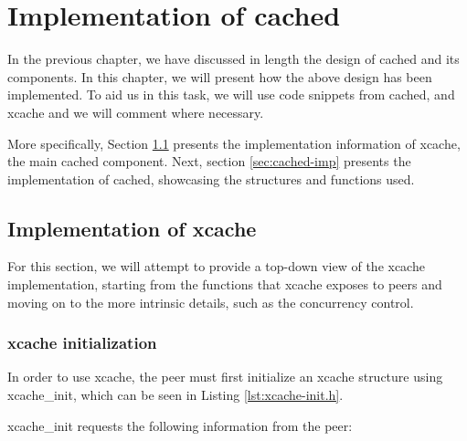 \chapter{Implementation of cached}\label{ch:cached-implementation}

In the previous chapter, we have discussed in length the design of cached and 
its components. In this chapter, we will present how the above design has been
implemented. To aid us in this task, we will use code snippets from cached, and 
xcache and we will comment where necessary.

More specifically, Section \ref{sec:xcache-imp} presents the implementation 
information of xcache, the main cached component. Next, section 
\ref{sec:cached-imp} presents the implementation of cached, showcasing the 
structures and functions used.

\section{Implementation of xcache}\label{sec:xcache-imp}

For this section, we will attempt to provide a top-down view of the xcache 
implementation, starting from the functions that xcache exposes to peers and 
moving on to the more intrinsic details, such as the concurrency control.

\subsection{xcache initialization}

In order to use xcache, the peer must first initialize an xcache structure 
using xcache\_init, which can be seen in Listing \ref{lst:xcache-init.h}.


xcache\_init requests the following information from the peer:

